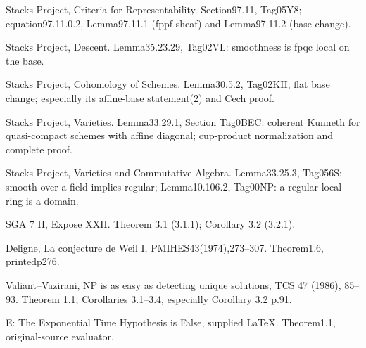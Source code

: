 Stacks Project, Criteria for Representability. Section97.11, Tag05Y8; equation97.11.0.2, Lemma97.11.1 (fppf sheaf) and Lemma97.11.2 (base change).

Stacks Project, Descent. Lemma35.23.29, Tag02VL: smoothness is fpqc local on the base.

Stacks Project, Cohomology of Schemes. Lemma30.5.2, Tag02KH, flat base change; especially its affine-base statement(2) and Cech proof.

Stacks Project, Varieties. Lemma33.29.1, Section Tag0BEC: coherent Kunneth for quasi-compact schemes with affine diagonal; cup-product normalization and complete proof.

Stacks Project, Varieties and Commutative Algebra. Lemma33.25.3, Tag056S: smooth over a field implies regular; Lemma10.106.2, Tag00NP: a regular local ring is a domain.

SGA 7 II, Expose XXII. Theorem 3.1 (3.1.1); Corollary 3.2 (3.2.1).

Deligne, La conjecture de Weil I, PMIHES43(1974),273--307. Theorem1.6, printedp276.

Valiant--Vazirani, NP is as easy as detecting unique solutions, TCS 47 (1986), 85--93. Theorem 1.1; Corollaries 3.1--3.4, especially Corollary 3.2 p.91.

E: The Exponential Time Hypothesis is False, supplied LaTeX. Theorem1.1, original-source evaluator.

